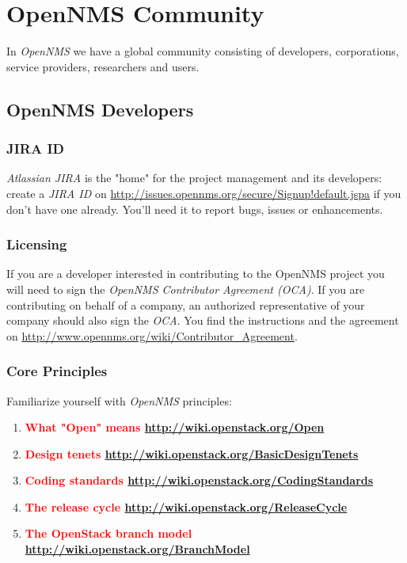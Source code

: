 \section{OpenNMS Community}
In \emph{OpenNMS} we have a global community consisting of developers, corporations, service providers, researchers and users.

\subsection{OpenNMS Developers}

\subsubsection{JIRA ID}
\emph{Atlassian JIRA} is the "home" for the project management and its developers: create a \emph{JIRA ID} on \url{http://issues.opennms.org/secure/Signup!default.jspa} if you don’t have one already. You’ll need it to report bugs, issues or enhancements.

\subsubsection{Licensing}
If you are a developer interested in contributing to the OpenNMS project you will need to sign the \emph{OpenNMS Contributor Agreement (OCA)}. If you are contributing on behalf of a company, an authorized representative of your company should also sign the \emph{OCA}. You find the instructions and the agreement on \url{http://www.opennms.org/wiki/Contributor_Agreement}.


\subsubsection{Core Principles}
Familiarize yourself with \emph{OpenNMS} principles:
\begin{enumerate}
  \item \textbf{\textcolor{red}{What "Open" means \url{http://wiki.openstack.org/Open}}}
  \item \textbf{\textcolor{red}{Design tenets \url{http://wiki.openstack.org/BasicDesignTenets}}}
  \item \textbf{\textcolor{red}{Coding standards \url{http://wiki.openstack.org/CodingStandards}}}
  \item \textbf{\textcolor{red}{The release cycle \url{http://wiki.openstack.org/ReleaseCycle}}}
  \item \textbf{\textcolor{red}{The OpenStack branch model \url{http://wiki.openstack.org/BranchModel}}}
\end{enumerate}

